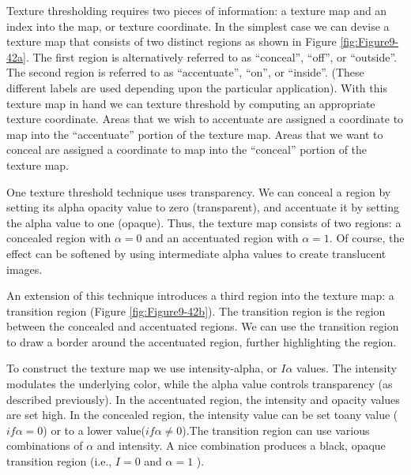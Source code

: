 Texture thresholding requires two pieces of information: a texture map and an index into the map, or texture coordinate. In the simplest case we can devise a texture map that consists of two distinct regions as shown in Figure \ref{fig:Figure9-42a}. The first region is alternatively referred to as ``conceal'', ``off'', or ``outside''. The second region is referred to as ``accentuate'', ``on'', or ``inside''. (These different labels are used depending upon the particular application). With this texture map in hand we can texture threshold by computing an appropriate texture coordinate. Areas that we wish to accentuate are assigned a coordinate to map into the ``accentuate'' portion of the texture map. Areas that we want to conceal are assigned a coordinate to map into the ``conceal'' portion of the texture map.

One texture threshold technique uses transparency. We can conceal a region by setting its alpha opacity value to zero (transparent), and accentuate it by setting the alpha value to one (opaque). Thus, the texture map consists of two regions: a concealed region with $\alpha = 0$ and an accentuated region with $\alpha = 1$. Of course, the effect can be softened by using intermediate alpha values to create translucent images.

An extension of this technique introduces a third region into the texture map: a transition region (Figure \ref{fig:Figure9-42b}). The transition region is the region between the concealed and accentuated regions. We can use the transition region to draw a border around the accentuated region, further highlighting the region.

To construct the texture map we use intensity-alpha, or $I\alpha$ values. The intensity modulates the underlying color, while the alpha value controls transparency (as described previously). In the accentuated region, the intensity and opacity values are set high. In the concealed region, the intensity value can be set toany value ($if \alpha = 0$) or to a lower value($if \alpha \ne 0$).The transition region can use various combinations of $\alpha$ and intensity. A nice combination produces a black, opaque transition region (i.e., $I = 0$ and $\alpha = 1$ ).


